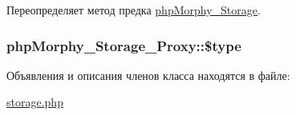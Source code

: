 Переопределяет метод предка \hyperlink{classphpMorphy__Storage_aa9c0a44d43f08620163b65af53089299}{phpMorphy\_\-Storage}.

\hypertarget{classphpMorphy__Storage__Proxy_a8509674fbad5c85720403ff230bd6774}{
\subsubsection[{\$type}]{\setlength{\rightskip}{0pt plus 5cm}phpMorphy\_\-Storage\_\-Proxy::\$type}}
\label{classphpMorphy__Storage__Proxy_a8509674fbad5c85720403ff230bd6774}


Объявления и описания членов класса находятся в файле:\begin{DoxyCompactItemize}
\item 
\hyperlink{storage_8php}{storage.php}\end{DoxyCompactItemize}
